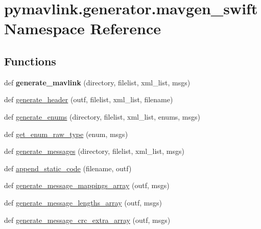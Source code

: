 \hypertarget{namespacepymavlink_1_1generator_1_1mavgen__swift}{}\section{pymavlink.\+generator.\+mavgen\+\_\+swift Namespace Reference}
\label{namespacepymavlink_1_1generator_1_1mavgen__swift}
\subsection*{Functions}
\begin{DoxyCompactItemize}
\item 
\mbox{\label{namespacepymavlink_1_1generator_1_1mavgen__swift_af3cee7a3866c8d6309e4dfc23284aa08}} 
def {\bfseries generate\+\_\+mavlink} (directory, filelist, xml\+\_\+list, msgs)
\item 
def \hyperlink{namespacepymavlink_1_1generator_1_1mavgen__swift_af86520c2c9b71b0133a82512d41f7b89}{generate\+\_\+header} (outf, filelist, xml\+\_\+list, filename)
\item 
def \hyperlink{namespacepymavlink_1_1generator_1_1mavgen__swift_a5603cdc6a0d7d2a8610a00132cc8cce5}{generate\+\_\+enums} (directory, filelist, xml\+\_\+list, enums, msgs)
\item 
def \hyperlink{namespacepymavlink_1_1generator_1_1mavgen__swift_afb9a96a35873d4a61daddaeac5c6a853}{get\+\_\+enum\+\_\+raw\+\_\+type} (enum, msgs)
\item 
def \hyperlink{namespacepymavlink_1_1generator_1_1mavgen__swift_a68339c0dfb0acc49c8dbfa99be213de0}{generate\+\_\+messages} (directory, filelist, xml\+\_\+list, msgs)
\item 
def \hyperlink{namespacepymavlink_1_1generator_1_1mavgen__swift_a44b1af0ce3b6338825d40002eb8dd76a}{append\+\_\+static\+\_\+code} (filename, outf)
\item 
def \hyperlink{namespacepymavlink_1_1generator_1_1mavgen__swift_a905071cf7748346eb9e0c8fccde6405f}{generate\+\_\+message\+\_\+mappings\+\_\+array} (outf, msgs)
\item 
def \hyperlink{namespacepymavlink_1_1generator_1_1mavgen__swift_ac76b28b77a9b6d1040ac2dacba539420}{generate\+\_\+message\+\_\+lengths\+\_\+array} (outf, msgs)
\item 
def \hyperlink{namespacepymavlink_1_1generator_1_1mavgen__swift_a85b6d1f85489a4db64118a6ee05004dc}{generate\+\_\+message\+\_\+crc\+\_\+extra\+\_\+array} (outf, msgs)

\end{DoxyCompactItemize}
